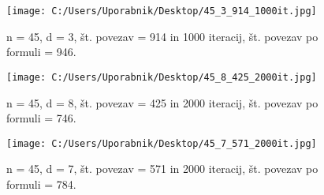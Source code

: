 \documentclass[12pt,a4paper]{amsart}
\theoremstyle{definition} %
\theoremstyle{plain} %
\begin{document}
\begin{figure}[h]
    \centering
    \texttt{[image: C:/Users/Uporabnik/Desktop/45\_3\_914\_1000it.jpg]} 
    \caption{n = 45, d = 3, št. povezav = 914 in 1000 iteracij, št. povezav po formuli = 946.}
    \label{fig:slika3}
\end{figure}

\begin{figure}[h]
    \centering
    \texttt{[image: C:/Users/Uporabnik/Desktop/45\_8\_425\_2000it.jpg]} 
    \caption{n = 45, d = 8, št. povezav = 425 in 2000 iteracij, št. povezav po formuli = 746.}
    \label{fig:slika3}
\end{figure}

\begin{figure}[h]
    \centering
    \texttt{[image: C:/Users/Uporabnik/Desktop/45\_7\_571\_2000it.jpg]} 
    \caption{n = 45, d = 7, št. povezav = 571 in 2000 iteracij, št. povezav po formuli = 784.}
    \label{fig:slika3}
\end{figure}
\end{document}
